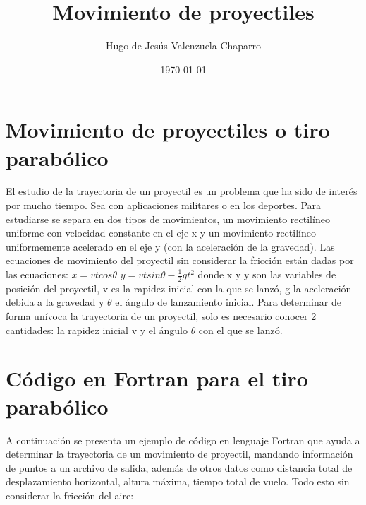 \documentclass[notitlepage,12pt]{article}
\title{Movimiento de proyectiles}
\author{Hugo de Jes\'us Valenzuela Chaparro}
\date{\today}
\begin{document}
\maketitle

\section{Movimiento de proyectiles o tiro parab\'olico}
El estudio de la trayectoria de un proyectil es un problema que ha sido de inter\'es por mucho tiempo. Sea 
con aplicaciones militares o en los deportes. Para estudiarse se separa en dos tipos de movimientos, un
movimiento rectil\'ineo uniforme con velocidad constante en el eje x y un movimiento rectil\'ineo uniformemente
acelerado en el eje y (con la aceleraci\'on de la gravedad). Las ecuaciones de movimiento del proyectil sin considerar
la fricción están dadas por las ecuaciones:
$x=vtcos\theta$
$y=vtsin\theta-\frac{1}{2}gt^2$
donde x y y son las variables de posición del proyectil, v es la rapidez inicial con la que se lanzó, g la aceleración 
debida a la gravedad y $\theta$ el \'angulo de lanzamiento inicial. Para determinar de forma unívoca la trayectoria de un proyectil, 
solo es necesario conocer 2 cantidades: la rapidez inicial v y el ángulo $\theta$  con el que se lanzó.

\section{C\'odigo en Fortran para el tiro parab\'olico}
A continuaci\'on se presenta un ejemplo de c\'odigo en lenguaje Fortran que ayuda a determinar la trayectoria de
un movimiento de proyectil, mandando informaci\'on de puntos a un archivo de salida, adem\'as de otros datos como 
distancia total de desplazamiento horizontal, altura m\'axima, tiempo total de vuelo. Todo esto sin considerar la
fricci\'on del aire:
\end{document}

